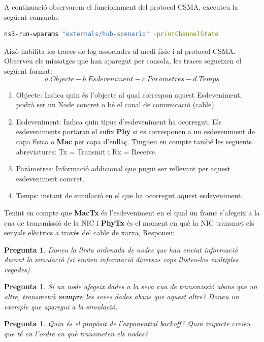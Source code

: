 \documentclass[12pt,a4paper]{article}
\newcounter{exercises}
\newtheorem{exer}[exercises]{Pregunta}
\begin{document}
\begin{enumerate}
A continuació observarem el funcionament del protocol CSMA, executeu la següent comanda:

\begin{lstlisting}[language=bash,basicstyle=\footnotesize]
   ns3-run-wparams "externals/hub-scenario" -printChannelState
\end{lstlisting}
Això habilita les traces de log associades al medi físic i al protocol CSMA. Observeu els missatges que han aparegut per consola, les traces segueixen el següent format:
$$
a. Objecte  - b. Esdeveniment - c. Parametres - d. Temps $$

\begin{enumerate}
\item Objecte: Indica quin és l'objecte al qual correspon aquest Esdeveniment, podrà ser un Node concret o bé el canal de comunicació (cable).
\item Esdeveniment: Indica quin tipus d'esdeveniment ha ocorregut. Els esdeveniments portaran el sufix \textbf{Phy} si es corresponen a un esdeveniment de capa física o \textbf{Mac} per capa d'enllaç. Tingueu en compte també les següents abreviatures: Tx = Transmit i Rx = Receive.
\item Paràmetres: Informació addicional que pugui ser rellevant per aquest esdeveniment concret.
\item Temps: instant de simulació en el que ha ocorregut aquest esdeveniment.
\end{enumerate}

Tenint en compte que \textbf{MacTx} és l'esdeveniment en el qual un frame s'afegeix a la cua de transmissió de la NIC i \textbf{PhyTx} és el moment en què la NIC transmet els senyals elèctrics a través del cable de xarxa, Responeu:
\begin{exer} Doneu la llista ordenada de nodes que han enviat informació durant la simulació (si envien informació diversos cops llisteu-los múltiples vegades).\end{exer}
\begin{exer} Si un node afegeix dades a la seva cua de transmissió abans que un altre, transmetrà \textbf{sempre} les seves dades abans que aquest altre? Doneu un exemple que aparegui a la simulació.
\end{exer}
\begin{exer} Quin és el propòsit de l'exponential backoff? Quin impacte creieu que té en l'ordre en què transmeten els nodes? \end{exer}
\end{enumerate}
\end{document}
